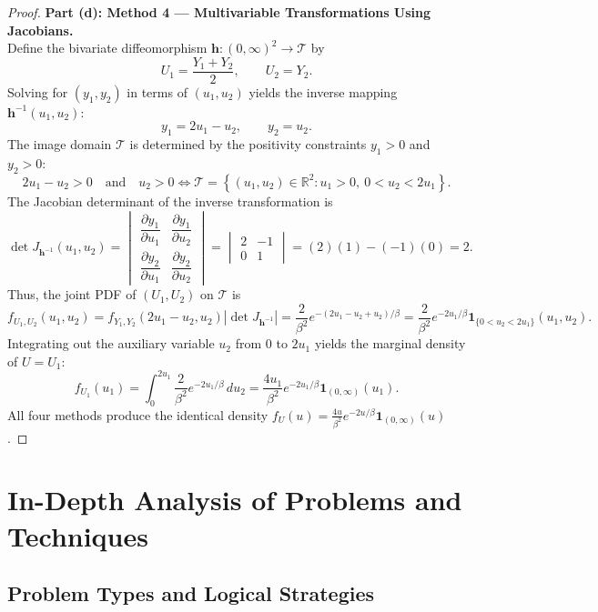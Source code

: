 \documentclass[11pt, letterpaper]{article}
\theoremstyle{definition}
\theoremstyle{remark}
\newcommand{\R}{\mathbb{R}}
\begin{document}
\begin{proof}
\textbf{Part (d): Method 4 — Multivariable Transformations Using Jacobians.} \\ \relax
Define the bivariate diffeomorphism $\mathbf{h} : (0, \infty)^2 \to \mathcal{T}$ by
\[
    U_1 = \frac{Y_1 + Y_2}{2}, \qquad U_2 = Y_2.
\]
Solving for $(y_1, y_2)$ in terms of $(u_1, u_2)$ yields the inverse mapping $\mathbf{h}^{-1}(u_1, u_2)$:
\[
    y_1 = 2u_1 - u_2, \qquad y_2 = u_2.
\]
The image domain $\mathcal{T}$ is determined by the positivity constraints $y_1 > 0$ and $y_2 > 0$:
\[
    2u_1 - u_2 > 0 \quad \text{and} \quad u_2 > 0 \iff \mathcal{T} = \left\{(u_1, u_2) \in \R^2 : u_1 > 0, \ 0 < u_2 < 2u_1\right\}.
\]
The Jacobian determinant of the inverse transformation is
\[
    \det J_{\mathbf{h}^{-1}}(u_1, u_2) = \begin{vmatrix} \dfrac{\partial y_1}{\partial u_1} & \dfrac{\partial y_1}{\partial u_2} \\[10pt] \dfrac{\partial y_2}{\partial u_1} & \dfrac{\partial y_2}{\partial u_2} \end{vmatrix} = \begin{vmatrix} 2 & -1 \\ 0 & 1 \end{vmatrix} = (2)(1) - (-1)(0) = 2.
\]
Thus, the joint PDF of $(U_1, U_2)$ on $\mathcal{T}$ is
\[
    f_{U_1, U_2}(u_1, u_2) = f_{Y_1, Y_2}(2u_1 - u_2, u_2) |\det J_{\mathbf{h}^{-1}}| = \frac{2}{\beta^2} e^{-(2u_1 - u_2 + u_2)/\beta} = \frac{2}{\beta^2} e^{-2u_1/\beta} \mathbf{1}_{\{0 < u_2 < 2u_1\}}(u_1, u_2).
\]
Integrating out the auxiliary variable $u_2$ from $0$ to $2u_1$ yields the marginal density of $U = U_1$:
\[
    f_{U_1}(u_1) = \int_{0}^{2u_1} \frac{2}{\beta^2} e^{-2u_1/\beta} \, du_2 = \frac{4u_1}{\beta^2} e^{-2u_1/\beta} \mathbf{1}_{(0, \infty)}(u_1).
\]
All four methods produce the identical density $f_U(u) = \frac{4u}{\beta^2}e^{-2u/\beta}\mathbf{1}_{(0,\infty)}(u)$.
\end{proof}

\newpage

\section{In-Depth Analysis of Problems and Techniques}

\subsection{Problem Types and Logical Strategies}
\end{document}
